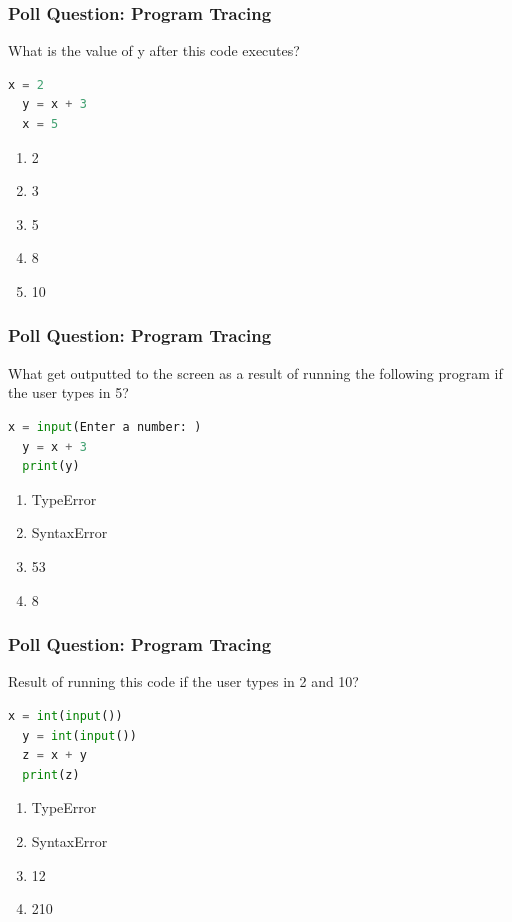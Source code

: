 \documentclass{beamer}
\begin{document}
%
%
%
\begin{frame}[fragile]
  \frametitle{Poll Question: Program Tracing}
  What is the value of y after this code executes?
  \begin{lstlisting}[language=Python]
  x = 2
  y = x + 3
  x = 5
  \end{lstlisting}
  \begin{enumerate}
    \item 2
    \item 3
    \item 5
    \item 8
    \item 10
  \end{enumerate}
\end{frame}

%
%
%
\begin{frame}[fragile]
  \frametitle{Poll Question: Program Tracing}
  What get outputted to the screen as a result of running the following program if the user types in 5?
  \begin{lstlisting}[language=Python]
  x = input(Enter a number: )
  y = x + 3
  print(y)
  \end{lstlisting}
  \begin{enumerate}
    \item TypeError
    \item SyntaxError
    \item 53
    \item 8
  \end{enumerate}
\end{frame}

%
%
%
\begin{frame}[fragile]
  \frametitle{Poll Question: Program Tracing}
  Result of running this code if the user types in 2 and 10?
  \begin{lstlisting}[language=Python]
  x = int(input())
  y = int(input())
  z = x + y
  print(z)
  \end{lstlisting}
  \begin{enumerate}
    \item TypeError
    \item SyntaxError
    \item 12
    \item 210
  \end{enumerate}
\end{frame}
\end{document}
